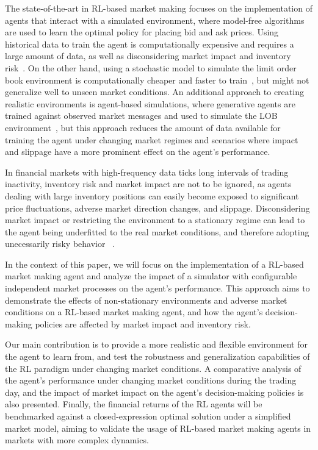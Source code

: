 The state-of-the-art in RL-based market making focuses on the implementation of agents that interact with a simulated environment,
where model-free algorithms are used to learn the optimal policy for placing bid and ask prices.
Using historical data to train the agent is computationally expensive and requires a large amount of data,
as well as disconsidering market impact and inventory risk~\cite{Frey2023, Ganesh2019}.
On the other hand, using a stochastic model to simulate the limit order book environment is computationally cheaper and faster to train~\cite{Gasperov2021, Sun2022},
but might not generalize well to unseen market conditions.
An additional approach to creating realistic environments is agent-based simulations,
where generative agents are trained against observed market messages and used to simulate the LOB environment~\cite{Frey2023, Ganesh2019},
but this approach reduces the amount of data available for training the agent under changing market regimes and
scenarios where impact and slippage have a more prominent effect on the agent's performance.

In financial markets with high-frequency data ticks long intervals of trading inactivity, inventory risk and market impact are not to be ignored,
as agents dealing with large inventory positions can easily become exposed to significant price fluctuations, adverse market direction changes, and slippage.
Disconsidering market impact or restricting the environment to a stationary regime can lead to the agent being underfitted to the real market conditions,
and therefore adopting unecessarily risky behavior ~\cite{Jerome2022, Selser2021}.

In the context of this paper, we will focus on the implementation of a RL-based market making agent and
analyze the impact of a simulator with configurable independent market processes on the agent's performance.
This approach aims to demonstrate the effects of non-stationary environments and adverse market conditions on
a RL-based market making agent, and how the agent's decision-making policies are affected by market impact and inventory risk.

Our main contribution is to provide a more realistic and flexible environment for the agent to learn from,
and test the robustness and generalization capabilities of the RL paradigm under changing market conditions.
A comparative analysis of the agent's performance under changing market conditions during the
trading day, and the impact of market impact on the agent's decision-making policies is also presented.
Finally, the financial returns of the RL agents will be benchmarked against a closed-expression optimal solution under a simplified market model,
aiming to validate the usage of RL-based market making agents in markets with more complex dynamics.
